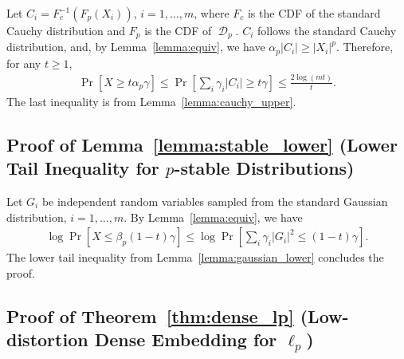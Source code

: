 \documentclass[11pt]{article}
\DeclareMathOperator{\D}{\mathcal{D}}
\begin{document}
Let $C_i = F_{c}^{-1}(F_p(X_i))$, $i=1,\ldots,m$, where $F_c$ is the CDF of the
standard Cauchy distribution and $F_p$ is the CDF of $\D_p$.
$C_i$ follows the standard Cauchy distribution, and, by Lemma~\ref{lemma:equiv},
we have $\alpha_p |C_i| \geq |X_i|^p$.
Therefore, for any $t \geq 1$,
\begin{align*}
  \Pr[X \geq t \alpha_p \gamma] \leq \Pr \left[ \sum_i \gamma_i |C_i| \geq t
    \gamma \right] \leq \frac{2 \log(m t)}{t}.
\end{align*}
The last inequality is from Lemma~\ref{lemma:cauchy_upper}.



\subsection{Proof of Lemma~\ref{lemma:stable_lower} (Lower Tail Inequality for $p$-stable Distributions)}
\label{sxn:pf-lp-stable-lower}

Let $G_i$ be independent random variables sampled from the standard Gaussian
distribution, $i=1, \ldots, m$.
By Lemma~\ref{lemma:equiv}, we have
\begin{align*}
  \log \Pr [ X \leq \beta_p(1-t) \gamma] \leq \log \Pr\left[ \sum_i
    \gamma_i |G_i|^2 \leq (1-t) \gamma\right].
\end{align*}
The lower tail inequality from Lemma~\ref{lemma:gaussian_lower} concludes the
proof.



\subsection{Proof of Theorem~\ref{thm:dense_lp} (Low-distortion Dense Embedding for
  $\ell_p$)}
\label{sxn:pf-dense_lp}
\end{document}

